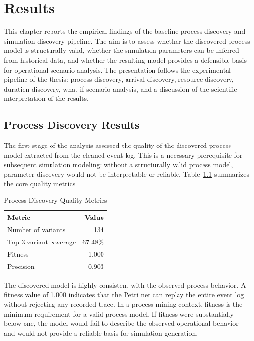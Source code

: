 \chapter{Results}
\label{chap:results}

This chapter reports the empirical findings of the baseline process-discovery and simulation-discovery pipeline. The aim is to assess whether the discovered process model is structurally valid, whether the simulation parameters can be inferred from historical data, and whether the resulting model provides a defensible basis for operational scenario analysis. The presentation follows the experimental pipeline of the thesis: process discovery, arrival discovery, resource discovery, duration discovery, what-if scenario analysis, and a discussion of the scientific interpretation of the results.

\section{Process Discovery Results}
\label{sec:process_discovery_results}

The first stage of the analysis assessed the quality of the discovered process model extracted from the cleaned event log. This is a necessary prerequisite for subsequent simulation modeling: without a structurally valid process model, parameter discovery would not be interpretable or reliable. Table~\ref{tab:process_discovery_quality} summarizes the core quality metrics.

\begin{table}[h!]
\centering
\caption{Process Discovery Quality Metrics}
\label{tab:process_discovery_quality}
\begin{tabular}{lr}
\toprule
Metric & Value \\
\midrule
Number of variants & 134 \\
Top-3 variant coverage & 67.48\% \\
Fitness & 1.000 \\
Precision & 0.903 \\
\bottomrule
\end{tabular}
\end{table}

The discovered model is highly consistent with the observed process behavior. A fitness value of 1.000 indicates that the Petri net can replay the entire event log without rejecting any recorded trace. In a process-mining context, fitness is the minimum requirement for a valid process model. If fitness were substantially below one, the model would fail to describe the observed operational behavior and would not provide a reliable basis for simulation generation.

